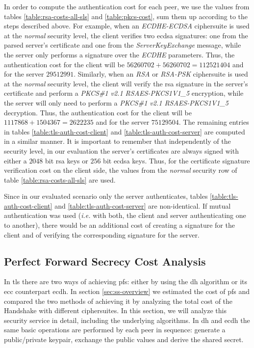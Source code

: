 \documentclass{llncs}
\begin{document}
In order to compute the authentication cost for each peer, we use the values from tables \ref{table:rsa-costs-all-sls} and \ref{table:pkcs-cost},
sum them up according to the steps described above. For example, when an \textit{ECDHE-ECDSA} ciphersuite is used at the \textit{normal} security level,
the client verifies two \gls{ecdsa} signatures: one from the parsed server's certificate
and one from the \textit{ServerKeyExchange} message, while the server only performs a signature over the \textit{ECDHE} parameters.
Thus, the authentication cost for the client will be $56260702+56260702=112521404$ and for the server $29512991$. Similarly, when an \textit{RSA} or
\textit{RSA-PSK} ciphersuite is used at the \textit{normal} security level, the client will verify the \gls{rsa} signature in the server's certificate
and perform a \textit{PKCS\#1 v2.1 RSAES-PKCS1\-V1\_5} encryption, while the server will only need to perform a
\textit{PKCS\#1 v2.1 RSAES-PKCS1\-V1\_5} decryption. Thus, the authentication cost for the client will be $1117868+1504367=2622235$ and for the server
$75129504$. The remaining entries in tables \ref{table:tls-auth-cost-client} and \ref{table:tls-auth-cost-server} are computed in a similar manner.
It is important to remember that independently of the security level, in our evaluation the server's certificates are always signed with either a 
$2048$ bit \gls{rsa} keys or $256$ bit \gls{ecdsa} keys. Thus, for the certificate signature verification cost on the client side, 
the values from the \textit{normal} security row of table \ref{table:rsa-costs-all-sls} are used.

Since in our evaluated scenario only the server authenticates, tables \ref{table:tls-auth-cost-client} and \ref{table:tls-auth-cost-server}
are non-identical. If mutual authentication was used (\textit{i.e.} with both, the client and server authenticating one to another), there would be
an additional cost of creating a signature for the client and of verifying the corresponding signature for the server.

\subsection{Perfect Forward Secrecy Cost Analysis} \label{sec:pfs-costs}

In \gls{tls} there are two ways of achieving \gls{pfs}: either by using the \gls{dh} algorithm or its \gls{ecc} counterpart \gls{ecdh}.
In section \ref{sec:ss-overview} we estimated the cost of \gls{pfs} and compared the two methods of achieving it by analyzing the total cost of the
Handshake with different ciphersuites. In this section, we will analyze this security service in detail, including the underlying algorithms.
In \gls{dh} and \gls{ecdh} the same basic operations are performed by each peer in sequence: generate a public/private keypair, exchange the public values
and derive the shared secret.
\end{document}
